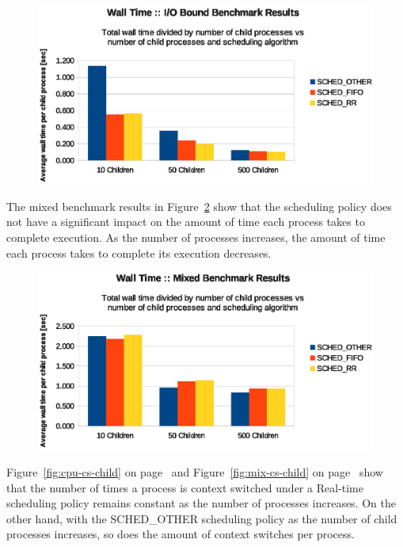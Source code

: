 \begin{figure}[H]
  \centering
  \includegraphics[scale=0.8]{img/io-wall-child.eps}
  \caption{}
  \label{fig:io-wall-child}
\end{figure}

The mixed benchmark results in Figure~\ref{fig:mix-wall-child} show that the scheduling policy does not have a significant impact on the amount of time each process takes to complete execution.  As the number of processes increases, the amount of time each process takes to complete its execution decreases.

\begin{figure}[H]
  \centering
  \includegraphics[scale=0.8]{img/mix-wall-child.eps}
  \caption{}
  \label{fig:mix-wall-child}
\end{figure}

Figure~\ref{fig:cpu-cs-child} on page~\pageref{fig:cpu-cs-child} and Figure~\ref{fig:mix-cs-child} on page~\pageref{fig:mix-cs-child} show that the number of times a process is context switched under a Real-time scheduling policy remains constant as the number of processes increases.  On the other hand, with the SCHED\_OTHER scheduling policy as the number of child processes increases, so does the amount of context switches per process.

